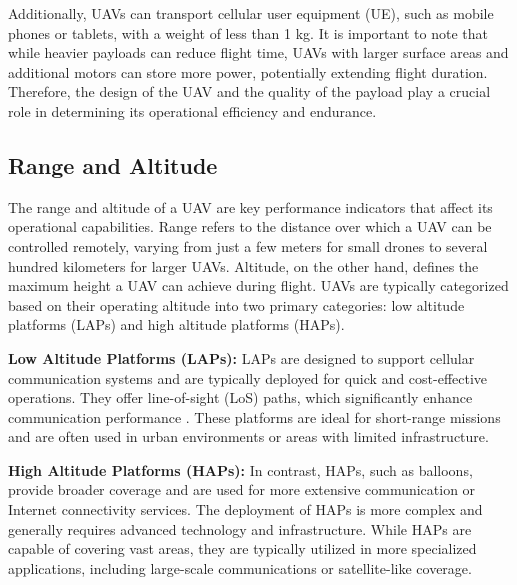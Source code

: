 \vspace{0.5cm}

Additionally, UAVs can transport cellular user equipment (UE), such as mobile phones or tablets, with a weight of less than 1 kg. It is important to note that while heavier payloads can reduce flight time, UAVs with larger surface areas and additional motors can store more power, potentially extending flight duration. Therefore, the design of the UAV and the quality of the payload play a crucial role in determining its operational efficiency and endurance.




\subsection{Range and Altitude}

The range and altitude of a UAV are key performance indicators that affect its operational capabilities. Range refers to the distance over which a UAV can be controlled remotely, varying from just a few meters for small drones to several hundred kilometers for larger UAVs. Altitude, on the other hand, defines the maximum height a UAV can achieve during flight. UAVs are typically categorized based on their operating altitude into two primary categories: low altitude platforms (LAPs) and high altitude platforms (HAPs).

\vspace{0.5cm}

\textbf{Low Altitude Platforms (LAPs):} LAPs are designed to support cellular communication systems and are typically deployed for quick and cost-effective operations. They offer line-of-sight (LoS) paths, which significantly enhance communication performance \cite{ref54}. These platforms are ideal for short-range missions and are often used in urban environments or areas with limited infrastructure.

\vspace{0.5cm}

\textbf{High Altitude Platforms (HAPs):} In contrast, HAPs, such as balloons, provide broader coverage and are used for more extensive communication or Internet connectivity services. The deployment of HAPs is more complex and generally requires advanced technology and infrastructure. While HAPs are capable of covering vast areas, they are typically utilized in more specialized applications, including large-scale communications or satellite-like coverage.


